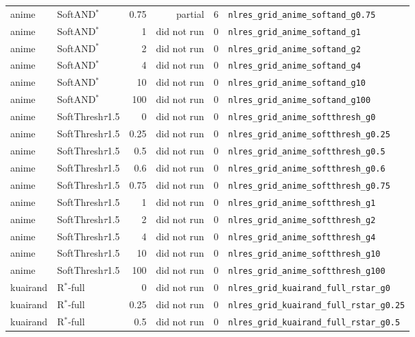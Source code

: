 \documentclass[10pt,a4paper]{article}
\begin{document}
{\begin{longtable}{llrrll}
anime & SoftAND$^*$ & 0.75 & partial & 6 & \texttt{nlres\_grid\_anime\_softand\_g0.75} \\
anime & SoftAND$^*$ & 1 & did not run & 0 & \texttt{nlres\_grid\_anime\_softand\_g1} \\
anime & SoftAND$^*$ & 2 & did not run & 0 & \texttt{nlres\_grid\_anime\_softand\_g2} \\
anime & SoftAND$^*$ & 4 & did not run & 0 & \texttt{nlres\_grid\_anime\_softand\_g4} \\
anime & SoftAND$^*$ & 10 & did not run & 0 & \texttt{nlres\_grid\_anime\_softand\_g10} \\
anime & SoftAND$^*$ & 100 & did not run & 0 & \texttt{nlres\_grid\_anime\_softand\_g100} \\
anime & SoftThresh$\tau$1.5 & 0 & did not run & 0 & \texttt{nlres\_grid\_anime\_softthresh\_g0} \\
anime & SoftThresh$\tau$1.5 & 0.25 & did not run & 0 & \texttt{nlres\_grid\_anime\_softthresh\_g0.25} \\
anime & SoftThresh$\tau$1.5 & 0.5 & did not run & 0 & \texttt{nlres\_grid\_anime\_softthresh\_g0.5} \\
anime & SoftThresh$\tau$1.5 & 0.6 & did not run & 0 & \texttt{nlres\_grid\_anime\_softthresh\_g0.6} \\
anime & SoftThresh$\tau$1.5 & 0.75 & did not run & 0 & \texttt{nlres\_grid\_anime\_softthresh\_g0.75} \\
anime & SoftThresh$\tau$1.5 & 1 & did not run & 0 & \texttt{nlres\_grid\_anime\_softthresh\_g1} \\
anime & SoftThresh$\tau$1.5 & 2 & did not run & 0 & \texttt{nlres\_grid\_anime\_softthresh\_g2} \\
anime & SoftThresh$\tau$1.5 & 4 & did not run & 0 & \texttt{nlres\_grid\_anime\_softthresh\_g4} \\
anime & SoftThresh$\tau$1.5 & 10 & did not run & 0 & \texttt{nlres\_grid\_anime\_softthresh\_g10} \\
anime & SoftThresh$\tau$1.5 & 100 & did not run & 0 & \texttt{nlres\_grid\_anime\_softthresh\_g100} \\
kuairand & R$^*$-full & 0 & did not run & 0 & \texttt{nlres\_grid\_kuairand\_full\_rstar\_g0} \\
kuairand & R$^*$-full & 0.25 & did not run & 0 & \texttt{nlres\_grid\_kuairand\_full\_rstar\_g0.25} \\
kuairand & R$^*$-full & 0.5 & did not run & 0 & \texttt{nlres\_grid\_kuairand\_full\_rstar\_g0.5} \\

\end{longtable}}
\end{document}
